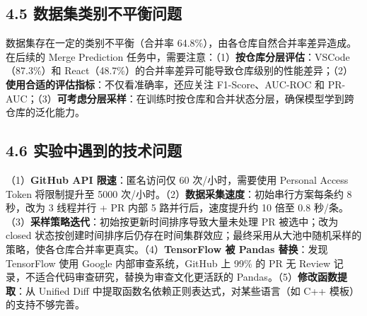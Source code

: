 \documentclass{experimentreport}
\begin{document}
{\subsection*{4.5 数据集类别不平衡问题}

数据集存在一定的类别不平衡（合并率 64.8\%），由各仓库自然合并率差异造成。在后续的 Merge Prediction 任务中，需要注意：（1）\textbf{按仓库分层评估}：VSCode（87.3\%）和 React（48.7\%）的合并率差异可能导致仓库级别的性能差异；（2）\textbf{使用合适的评估指标}：不仅看准确率，还应关注 F1-Score、AUC-ROC 和 PR-AUC；（3）\textbf{可考虑分层采样}：在训练时按仓库和合并状态分层，确保模型学到跨仓库的泛化能力。

\subsection*{4.6 实验中遇到的技术问题}

（1）\textbf{GitHub API 限速}：匿名访问仅 60 次/小时，需要使用 Personal Access Token 将限制提升至 5000 次/小时。（2）\textbf{数据采集速度}：初始串行方案每条约 8 秒，改为 3 线程并行 + PR 内部 5 路并行后，速度提升约 10 倍至 0.8 秒/条。（3）\textbf{采样策略迭代}：初始按更新时间排序导致大量未处理 PR 被选中；改为 closed 状态按创建时间排序后仍存在时间集群效应；最终采用从大池中随机采样的策略，使各仓库合并率更真实。（4）\textbf{TensorFlow 被 Pandas 替换}：发现 TensorFlow 使用 Google 内部审查系统，GitHub 上 99\% 的 PR 无 Review 记录，不适合代码审查研究，替换为审查文化更活跃的 Pandas。（5）\textbf{修改函数提取}：从 Unified Diff 中提取函数名依赖正则表达式，对某些语言（如 C++ 模板）的支持不够完善。
}




\teachercomment
\end{document}
